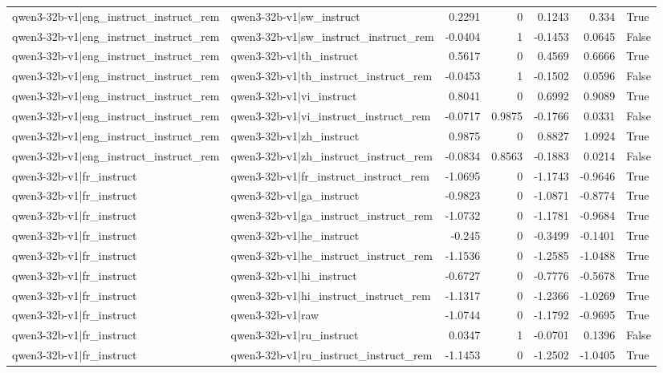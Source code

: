 \begin{table}
\begin{tabular}{l l r r r r l}
qwen3-32b-v1|eng_instruct_instruct_rem & qwen3-32b-v1|sw_instruct & 0.2291 & 0 & 0.1243 & 0.334 & True \\
qwen3-32b-v1|eng_instruct_instruct_rem & qwen3-32b-v1|sw_instruct_instruct_rem & -0.0404 & 1 & -0.1453 & 0.0645 & False \\
qwen3-32b-v1|eng_instruct_instruct_rem & qwen3-32b-v1|th_instruct & 0.5617 & 0 & 0.4569 & 0.6666 & True \\
qwen3-32b-v1|eng_instruct_instruct_rem & qwen3-32b-v1|th_instruct_instruct_rem & -0.0453 & 1 & -0.1502 & 0.0596 & False \\
qwen3-32b-v1|eng_instruct_instruct_rem & qwen3-32b-v1|vi_instruct & 0.8041 & 0 & 0.6992 & 0.9089 & True \\
qwen3-32b-v1|eng_instruct_instruct_rem & qwen3-32b-v1|vi_instruct_instruct_rem & -0.0717 & 0.9875 & -0.1766 & 0.0331 & False \\
qwen3-32b-v1|eng_instruct_instruct_rem & qwen3-32b-v1|zh_instruct & 0.9875 & 0 & 0.8827 & 1.0924 & True \\
qwen3-32b-v1|eng_instruct_instruct_rem & qwen3-32b-v1|zh_instruct_instruct_rem & -0.0834 & 0.8563 & -0.1883 & 0.0214 & False \\
qwen3-32b-v1|fr_instruct & qwen3-32b-v1|fr_instruct_instruct_rem & -1.0695 & 0 & -1.1743 & -0.9646 & True \\
qwen3-32b-v1|fr_instruct & qwen3-32b-v1|ga_instruct & -0.9823 & 0 & -1.0871 & -0.8774 & True \\
qwen3-32b-v1|fr_instruct & qwen3-32b-v1|ga_instruct_instruct_rem & -1.0732 & 0 & -1.1781 & -0.9684 & True \\
qwen3-32b-v1|fr_instruct & qwen3-32b-v1|he_instruct & -0.245 & 0 & -0.3499 & -0.1401 & True \\
qwen3-32b-v1|fr_instruct & qwen3-32b-v1|he_instruct_instruct_rem & -1.1536 & 0 & -1.2585 & -1.0488 & True \\
qwen3-32b-v1|fr_instruct & qwen3-32b-v1|hi_instruct & -0.6727 & 0 & -0.7776 & -0.5678 & True \\
qwen3-32b-v1|fr_instruct & qwen3-32b-v1|hi_instruct_instruct_rem & -1.1317 & 0 & -1.2366 & -1.0269 & True \\
qwen3-32b-v1|fr_instruct & qwen3-32b-v1|raw & -1.0744 & 0 & -1.1792 & -0.9695 & True \\
qwen3-32b-v1|fr_instruct & qwen3-32b-v1|ru_instruct & 0.0347 & 1 & -0.0701 & 0.1396 & False \\
qwen3-32b-v1|fr_instruct & qwen3-32b-v1|ru_instruct_instruct_rem & -1.1453 & 0 & -1.2502 & -1.0405 & True \\

\end{tabular}
\end{table}
